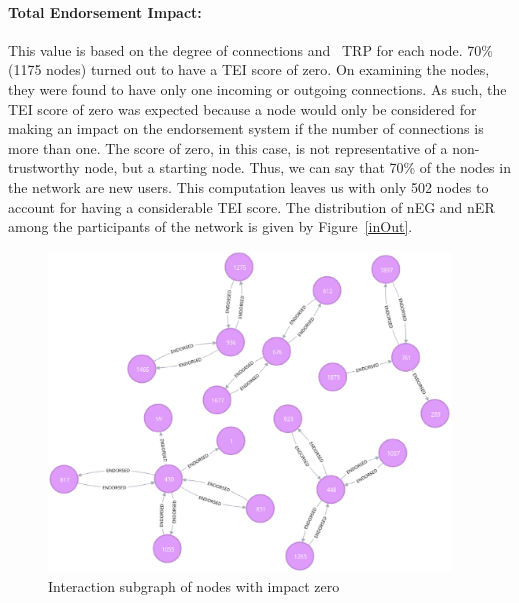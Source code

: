 \paragraph{Total Endorsement Impact:}This value is based on the degree of
connections and ~\ac{TRP} for each node. 70\% (1175 nodes) turned out to have a
\ac{TEI} score of zero. On examining the nodes, they were found to have only
one incoming or outgoing connections. As such, the \ac{TEI} score of zero was
expected because a node would only be considered for making an impact on the
endorsement system if the number of connections is more than one. The score of
zero, in this case, is not representative of a non-trustworthy node, but a
starting node. Thus, we can say that 70\% of the nodes in the network are new
users. This computation leaves us with only 502 nodes to account for having a
considerable \ac{TEI} score. The distribution of \ac{nEG} and \ac{nER} among
the participants of the network is given by Figure~\ref{inOut}. 
\begin{figure}
	\includegraphics[width=0.95\textwidth]{Images/nodesWithImpactZero.eps}
	\caption{Interaction subgraph of nodes with impact zero}
	\label{fig:zeroimpact}
\end{figure}
